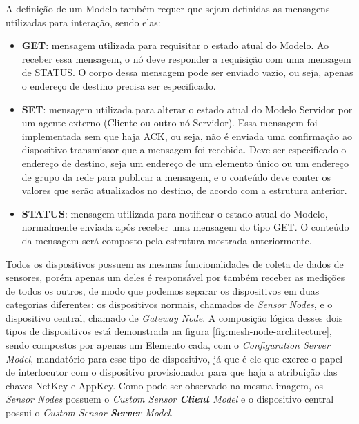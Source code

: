 \documentclass[../monografia.tex]{subfiles}
\begin{document}
A definição de um Modelo também requer que sejam definidas as mensagens utilizadas para interação, sendo elas:

\begin{itemize}
	\item \textbf{GET}: mensagem utilizada para requisitar o estado atual do Modelo. Ao receber essa mensagem, o nó deve responder a requisição com uma mensagem de STATUS. O corpo dessa mensagem pode ser enviado vazio, ou seja, apenas o endereço de destino precisa ser especificado.
	\item \textbf{SET}: mensagem utilizada para alterar o estado atual do Modelo Servidor por um agente externo (Cliente ou outro nó Servidor). Essa mensagem foi implementada sem que haja ACK, ou seja, não é enviada uma confirmação ao dispositivo transmissor que a mensagem foi recebida. Deve ser especificado o endereço de destino, seja um endereço de um elemento único ou um endereço de grupo da rede para publicar a mensagem, e o conteúdo deve conter os valores que serão atualizados no destino, de acordo com a estrutura anterior.
	\item \textbf{STATUS}: mensagem utilizada para notificar o estado atual do Modelo, normalmente enviada após receber uma mensagem do tipo GET. O conteúdo da mensagem será composto pela estrutura mostrada anteriormente.
\end{itemize}

Todos os dispositivos possuem as mesmas funcionalidades de coleta de dados de sensores, porém apenas um deles é responsável por também receber as medições de todos os outros, de modo que podemos separar os dispositivos em duas categorias diferentes: os dispositivos normais, chamados de \textit{Sensor Nodes}, e o dispositivo central, chamado de \textit{Gateway Node}. A composição lógica desses dois tipos de dispositivos está demonstrada na figura \ref{fig:mesh-node-architecture}, sendo compostos por apenas um Elemento cada, com o \textit{Configuration Server Model}, mandatório para esse tipo de dispositivo, já que é ele que exerce o papel de interlocutor com o dispositivo provisionador para que haja a atribuição das chaves NetKey e AppKey. Como pode ser observado na mesma imagem, os \textit{Sensor Nodes} possuem o \textit{Custom Sensor \textbf{Client} Model} e o dispositivo central possui o \textit{Custom Sensor \textbf{Server} Model}.
\end{document}
